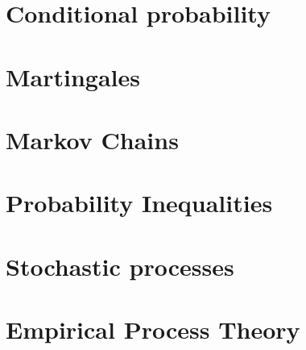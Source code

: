 \documentclass[6pt, letterpaper, twocolumn]{article}
\begin{document}
\part{Conditional probability}
\clearpage


\part{Martingales}
\clearpage

\part{Markov Chains}
\clearpage


\part{Probability Inequalities}
\clearpage

\part{Stochastic processes}
\clearpage

\part{Empirical Process Theory}
\clearpage
\end{document}
